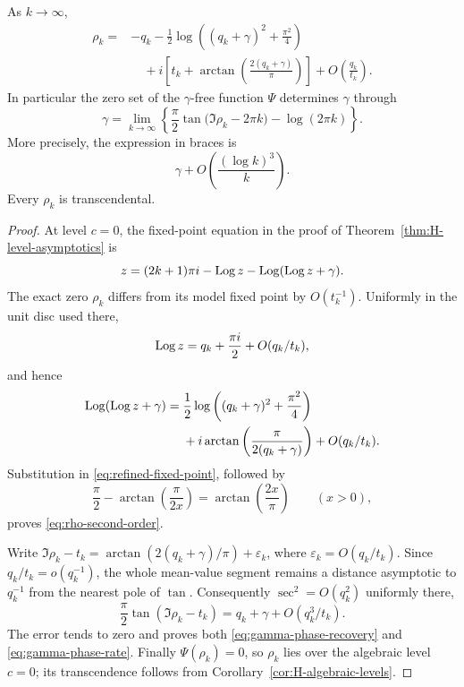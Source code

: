 \begin{theorem}
\label{thm:gamma-free-zero-phase}
As $k\to\infty$,
\begin{align}
 \rho_k={}&-q_k-\frac12\log\left((q_k+\gamma)^2+\frac{\pi^2}{4}\right)
 \label{eq:rho-second-order}\\
 &\quad+i\left[t_k+\arctan\left(\frac{2(q_k+\gamma)}{\pi}\right)\right]
 +O\left(\frac{q_k}{t_k}\right).\nonumber
\end{align}
In particular the zero set of the $\gamma$-free function $\Psi$ determines
$\gamma$ through
\begin{equation}\label{eq:gamma-phase-recovery}
 \boxed{
 \gamma=\lim_{k\to\infty}
 \left\{
  \frac\pi2\tan\bigl(\Im\rho_k-2\pi k\bigr)-\log(2\pi k)
 \right\}.}
\end{equation}
More precisely, the expression in braces is
\begin{equation}\label{eq:gamma-phase-rate}
 \gamma+O\!\left(\frac{(\log k)^3}{k}\right).
\end{equation}
Every $\rho_k$ is transcendental.
\end{theorem}

\begin{proof}
At level $c=0$, the fixed-point equation in the proof of
Theorem~\ref{thm:H-level-asymptotics} is
\begin{equation}\label{eq:refined-fixed-point}
 z=(2k+1)\pi i-\operatorname{Log} z-\operatorname{Log}(\operatorname{Log} z+\gamma).
\end{equation}
The exact zero $\rho_k$ differs from its model fixed point by $O(t_k^{-1})$.
Uniformly in the unit disc used there,
\[
 \operatorname{Log} z=q_k+\frac{\pi i}{2}+O(q_k/t_k),
\]
and hence
\begin{align*}
 \operatorname{Log}(\operatorname{Log} z+\gamma)
  ={}&\frac12\log\left((q_k+\gamma)^2+\frac{\pi^2}{4}\right)\\
   &+i\arctan\left(\frac{\pi}{2(q_k+\gamma)}\right)
     +O(q_k/t_k).
\end{align*}
Substitution in \eqref{eq:refined-fixed-point}, followed by
\[
 \frac\pi2-\arctan\left(\frac{\pi}{2x}\right)
 =\arctan\left(\frac{2x}{\pi}\right)
 \qquad(x>0),
\]
proves \eqref{eq:rho-second-order}.

Write
$\Im\rho_k-t_k=\arctan(2(q_k+\gamma)/\pi)+\varepsilon_k$, where
$\varepsilon_k=O(q_k/t_k)$.  Since $q_k/t_k=o(q_k^{-1})$, the whole
mean-value segment remains a distance asymptotic to $q_k^{-1}$ from the
nearest pole of $\tan$.  Consequently $\sec^2=O(q_k^2)$ uniformly there,
\[
 \frac\pi2\tan(\Im\rho_k-t_k)
 =q_k+\gamma+O(q_k^3/t_k).
\]
The error tends to zero and proves both
\eqref{eq:gamma-phase-recovery} and \eqref{eq:gamma-phase-rate}.
Finally $\Psi(\rho_k)=0$, so $\rho_k$ lies over the algebraic level
$c=0$; its transcendence follows from
Corollary~\ref{cor:H-algebraic-levels}.
\end{proof}


